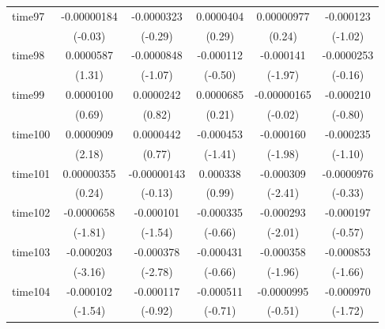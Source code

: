 \begin{table}[htbp]
\begin{tabular}{l*{5}{c}}
time97      & -0.00000184         &  -0.0000323         &   0.0000404         &  0.00000977         &   -0.000123         \\
            &     (-0.03)         &     (-0.29)         &      (0.29)         &      (0.24)         &     (-1.02)         \\
time98      &   0.0000587         &  -0.0000848         &   -0.000112         &   -0.000141\sym{*}  &  -0.0000253         \\
            &      (1.31)         &     (-1.07)         &     (-0.50)         &     (-1.97)         &     (-0.16)         \\
time99      &   0.0000100         &   0.0000242         &   0.0000685         & -0.00000165         &   -0.000210         \\
            &      (0.69)         &      (0.82)         &      (0.21)         &     (-0.02)         &     (-0.80)         \\
time100     &   0.0000909\sym{*}  &   0.0000442         &   -0.000453         &   -0.000160\sym{*}  &   -0.000235         \\
            &      (2.18)         &      (0.77)         &     (-1.41)         &     (-1.98)         &     (-1.10)         \\
time101     &  0.00000355         & -0.00000143         &    0.000338         &   -0.000309\sym{*}  &  -0.0000976         \\
            &      (0.24)         &     (-0.13)         &      (0.99)         &     (-2.41)         &     (-0.33)         \\
time102     &  -0.0000658         &   -0.000101         &   -0.000335         &   -0.000293\sym{*}  &   -0.000197         \\
            &     (-1.81)         &     (-1.54)         &     (-0.66)         &     (-2.01)         &     (-0.57)         \\
time103     &   -0.000203\sym{**} &   -0.000378\sym{**} &   -0.000431         &   -0.000358         &   -0.000853         \\
            &     (-3.16)         &     (-2.78)         &     (-0.66)         &     (-1.96)         &     (-1.66)         \\
time104     &   -0.000102         &   -0.000117         &   -0.000511         &  -0.0000995         &   -0.000970         \\
            &     (-1.54)         &     (-0.92)         &     (-0.71)         &     (-0.51)         &     (-1.72)         \\

\end{tabular}
\end{table}
